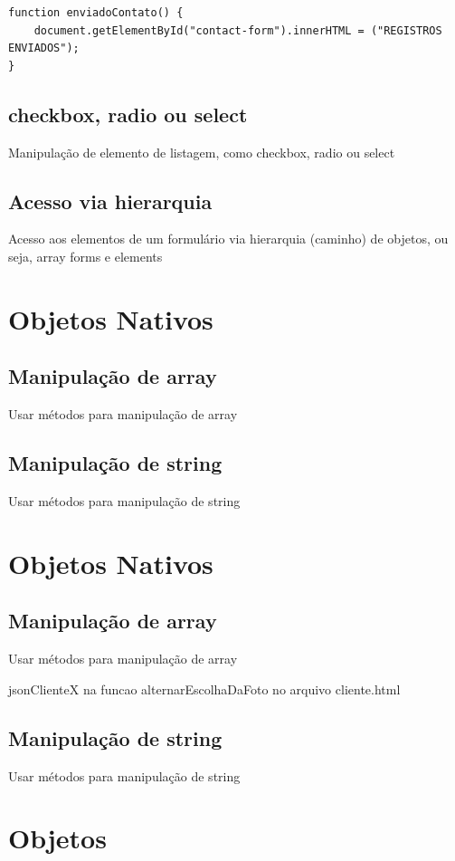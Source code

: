 \begin{lstlisting}
function enviadoContato() {
    document.getElementById("contact-form").innerHTML = ("REGISTROS ENVIADOS");
}
\end{lstlisting}


\subsection{checkbox, radio ou select}
Manipulação de elemento de listagem, como checkbox, radio ou select


\subsection{Acesso via hierarquia}
Acesso aos elementos de um formulário via hierarquia (caminho) de objetos, ou seja, array forms e elements



\section{Objetos Nativos }
\subsection{Manipulação de array}
Usar métodos para manipulação de array
\subsection{Manipulação de string}
Usar métodos para manipulação de string

\section{Objetos Nativos}
\subsection{Manipulação de array}
Usar métodos para manipulação de array

jsonClienteX na funcao alternarEscolhaDaFoto no arquivo cliente.html



\subsection{Manipulação de string}


Usar métodos para manipulação de string


\section{Objetos}
